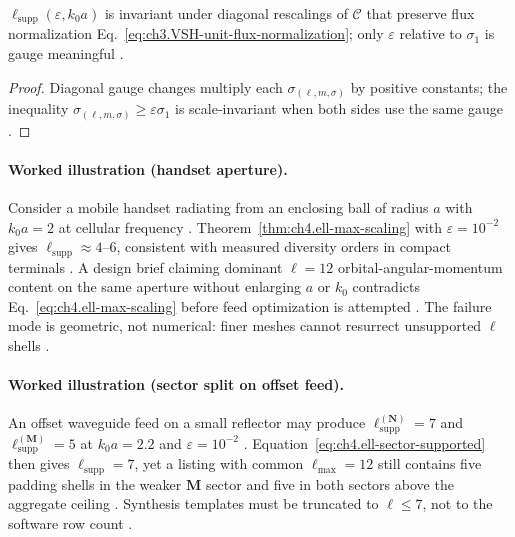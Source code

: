 \begin{proposition}
\label{prop:ch4.ell-supp-gauge-stable}
\(\ell_{\mathrm{supp}}(\varepsilon,k_{0}a)\) is invariant under diagonal rescalings of \(\mathcal{C}\) that preserve flux normalization
Eq.~\eqref{eq:ch3.VSH-unit-flux-normalization}; only \(\varepsilon\) relative to \(\sigma_{1}\) is gauge meaningful
\cite{hansen1988,stratton1941,harrington2001}.
\end{proposition}
\begin{proof}
Diagonal gauge changes multiply each \(\sigma_{(\ell,m,\sigma)}\) by positive constants; the inequality
\(\sigma_{(\ell,m,\sigma)}\ge\varepsilon\sigma_{1}\) is scale-invariant when both sides use the same gauge \cite{hansen1988,harrington2001}.
\end{proof}

\paragraph{Worked illustration (handset aperture).}
Consider a mobile handset radiating from an enclosing ball of radius \(a\) with \(k_{0}a=2\) at cellular frequency
\cite{collin2001,jackson1999}. Theorem~\ref{thm:ch4.ell-max-scaling} with \(\varepsilon=10^{-2}\) gives
\(\ell_{\mathrm{supp}}\approx4\)--\(6\), consistent with measured diversity orders in compact terminals \cite{hansen1988,harrington2001}.
A design brief claiming dominant \(\ell=12\) orbital-angular-momentum content on the same aperture without enlarging \(a\) or \(k_{0}\)
contradicts Eq.~\eqref{eq:ch4.ell-max-scaling} before feed optimization is attempted \cite{devaney2004,jackson1999}. The failure mode is
geometric, not numerical: finer meshes cannot resurrect unsupported \(\ell\) shells \cite{stratton1941,hansen1988}.

\paragraph{Worked illustration (sector split on offset feed).}
An offset waveguide feed on a small reflector may produce \(\ell_{\mathrm{supp}}^{(\mathbf{N})}=7\) and
\(\ell_{\mathrm{supp}}^{(\mathbf{M})}=5\) at \(k_{0}a=2.2\) and \(\varepsilon=10^{-2}\) \cite{harrington2001,collin2001}. Equation~\eqref{eq:ch4.ell-sector-supported}
then gives \(\ell_{\mathrm{supp}}=7\), yet a listing with common \(\ell_{\max}=12\) still contains five padding shells in the weaker
\(\mathbf{M}\) sector and five in both sectors above the aggregate ceiling \cite{hansen1988,devaney2004}. Synthesis templates must be
truncated to \(\ell\le7\), not to the software row count \cite{stratton1941}.

